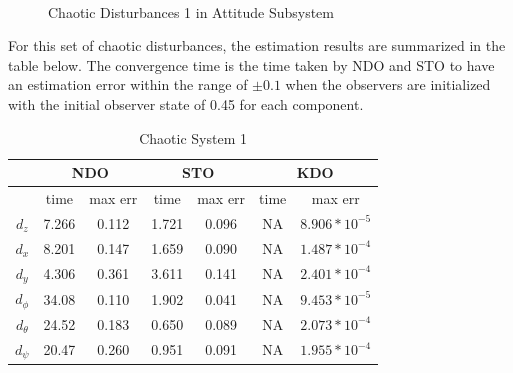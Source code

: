 \documentclass[letterpaper%
, twoside%
, 12pt%
,memoire%
, english%
,creativecommons,hyperref%
]{thETS}
\begin{document}
\begin{figure}[H]
\centering
{}
\\ \parbox{0.75\textwidth}{\caption{Chaotic Disturbances 1 in Attitude Subsystem}\label{dis_m1_att}}
\end{figure}


For this set of chaotic disturbances, the estimation results are summarized in the table below. The convergence time is the time taken by NDO and STO to have an estimation error within the range of $\pm0.1$ when the observers are initialized with the initial observer state of 0.45 for each component. 



\begin{table}[!htbp]
\centering
\caption{Chaotic System 1}
\begin{tabular}{|c|c|c|c|c|c|c|}
\hline
{}  &  \multicolumn{2}{c|}{NDO} & \multicolumn{2}{c|}{STO} & \multicolumn{2}{c|}{KDO}\\
\hline
{}        &   time & max err  & time  &max err& time  & max err\\
$d_z$     &  7.266 & 0.112   & 1.721  & 0.096 & NA     & $8.906*10^{-5}$\\
$d_x$     &  8.201 & 0.147   & 1.659  & 0.090 & NA     & $1.487*10^{-4}$\\
$d_y$     &  4.306 & 0.361   & 3.611  & 0.141 & NA     & $2.401*10^{-4}$\\
$d_\phi$  &  34.08 & 0.110   & 1.902  & 0.041 & NA     & $9.453*10^{-5}$\\
$d_\theta$&  24.52 & 0.183   & 0.650  & 0.089 & NA     & $2.073*10^{-4}$\\
$d_\psi$  &  20.47 & 0.260   & 0.951  & 0.091 & NA     & $1.955*10^{-4}$\\

\hline
\end{tabular}
\end{table}
\end{document}
